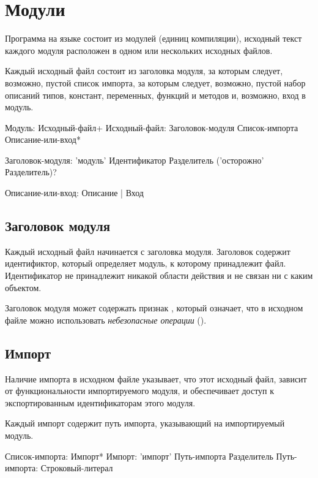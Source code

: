\hypertarget{modules}{%
\section{Модули}\label{mods:chapter}}

Программа на языке \thelang{} состоит из модулей (единиц компиляции), исходный текст каждого модуля расположен в одном или нескольких исходных файлов.

Каждый исходный файл состоит из заголовка модуля, за которым следует, возможно, пустой список импорта, 
за которым следует, возможно, пустой набор описаний типов, констант, переменных, функций и методов и, возможно, вход в модуль.

\begin{Grammar}
Модуль: Исходный-файл+
Исходный-файл:
    Заголовок-модуля
    Список-импорта
    Описание-или-вход*

Заголовок-модуля:
    'модуль' Идентификатор Разделитель
     ('осторожно' Разделитель)?

Описание-или-вход: Описание | Вход
\end{Grammar} 

\hypertarget{mod-header}{%
\subsection{Заголовок модуля}\label{mods:mod-header}}

Каждый исходный файл начинается с заголовка модуля. Заголовок содержит идентификтор, который определяет модуль,
к которому принадлежит файл. Идентификатор не принадлежит никакой области действия и не связан ни с каким объектом.

Заголовок модуля может содержать признак , который означает, что в исходном файле можно использовать 
\emph{небезопасные операции} ().

\hypertarget{import}{%
\subsection{Импорт}\label{mods:import}}

Наличие импорта в исходном файле указывает, что этот исходный файл, зависит от функциональности импортируемого модуля, и обеспечивает доступ к экспортированным идентификаторам этого модуля.

Каждый импорт содержит путь импорта, указывающий на импортируемый модуль.

\begin{Grammar}
Список-импорта: Импорт*
Импорт: 'импорт' Путь-импорта Разделитель
Путь-импорта: Строковый-литерал
\end{Grammar} 

